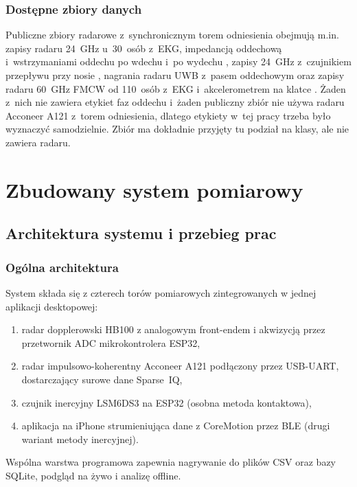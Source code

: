 \documentclass[12pt,a4paper,oneside]{report}
\begin{document}
\section{Dostępne zbiory danych}
Publiczne zbiory radarowe z~synchronicznym torem odniesienia obejmują m.in.
zapisy radaru \SI{24}{GHz} u~30~osób z~EKG, impedancją oddechową
i~wstrzymaniami oddechu po wdechu i~po wydechu \cite{schellenberger2020},
zapisy \SI{24}{GHz} z~czujnikiem przepływu przy nosie \cite{shi2020},
nagrania radaru UWB z~pasem oddechowym \cite{mobivital2025} oraz zapisy
radaru \SI{60}{GHz} FMCW od 110~osób z~EKG i~akcelerometrem na klatce
\cite{parralejo2026}. Żaden z~nich nie zawiera etykiet faz oddechu i~żaden
publiczny zbiór nie używa radaru Acconeer A121 z~torem odniesienia, dlatego
etykiety w~tej pracy trzeba było wyznaczyć samodzielnie. Zbiór
\cite{szymanski2025} ma dokładnie przyjęty tu podział na klasy, ale nie
zawiera radaru.

\part{Zbudowany system pomiarowy}
\label{part:system}

\chapter{Architektura systemu i przebieg prac}
\label{chap:architektura}

\section{Ogólna architektura}
System składa się z czterech torów pomiarowych zintegrowanych w jednej
aplikacji desktopowej:
\begin{enumerate}
  \item radar dopplerowski HB100 z analogowym front-endem i akwizycją przez
  przetwornik ADC mikrokontrolera ESP32,
  \item radar impulsowo-koherentny Acconeer A121 podłączony przez USB-UART,
  dostarczający surowe dane Sparse~IQ,
  \item czujnik inercyjny LSM6DS3 na ESP32 (osobna metoda kontaktowa),
  \item aplikacja na iPhone strumieniująca dane z CoreMotion przez BLE
  (drugi wariant metody inercyjnej).
\end{enumerate}
Wspólna warstwa programowa zapewnia nagrywanie do plików CSV oraz bazy
SQLite, podgląd na żywo i analizę offline.
\end{document}
